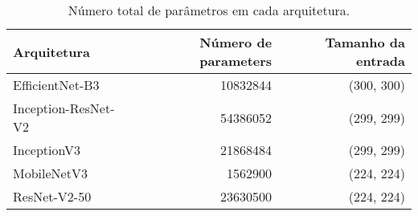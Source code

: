 \begin{table}
\caption{Número total de parâmetros em cada arquitetura.}
\label{tab:model_params}
\begin{tabular}{lrr}
\toprule
Arquitetura & Número de parameters & Tamanho da entrada \\
\midrule
EfficientNet-B3 & 10832844 & (300, 300) \\
Inception-ResNet-V2 & 54386052 & (299, 299) \\
InceptionV3 & 21868484 & (299, 299) \\
MobileNetV3 & 1562900 & (224, 224) \\
ResNet-V2-50 & 23630500 & (224, 224) \\
\bottomrule
\end{tabular}
\end{table}
